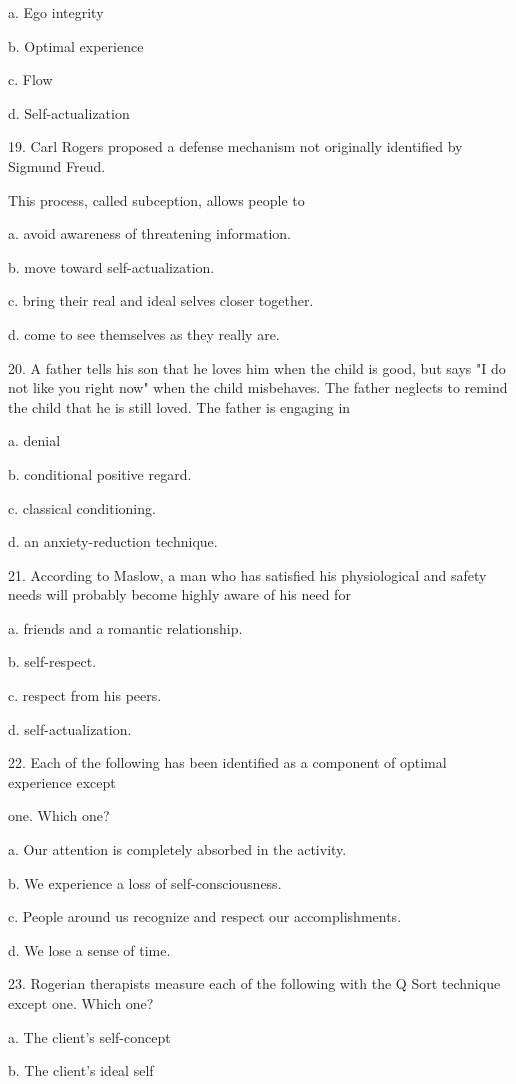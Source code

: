 \documentclass{article}
\begin{document}
a. Ego integrity

b. Optimal experience

c. Flow

d. Self-actualization

19. Carl Rogers proposed a defense mechanism not originally identified by Sigmund Freud.

This process, called subception, allows people to

a. avoid awareness of threatening information.

b. move toward self-actualization.

c. bring their real and ideal selves closer together.

d. come to see themselves as they really are.

20. A father tells his son that he loves him when the child is good, but says "I do not like you right now" when the child misbehaves. The father neglects to remind the child that he is still loved. The father is engaging in

a. denial

b. conditional positive regard.

c. classical conditioning.

d. an anxiety-reduction technique.

21. According to Maslow, a man who has satisfied his physiological and safety needs will probably become highly aware of his need for

a. friends and a romantic relationship.

b. self-respect.

c. respect from his peers.

d. self-actualization.

22. Each of the following has been identified as a component of optimal experience except

one. Which one?

a. Our attention is completely absorbed in the activity.

b. We experience a loss of self-consciousness.

c. People around us recognize and respect our accomplishments.

d. We lose a sense of time.

23. Rogerian therapists measure each of the following with the Q Sort technique except one. Which one?

a. The client's self-concept

b. The client's ideal self
\end{document}

